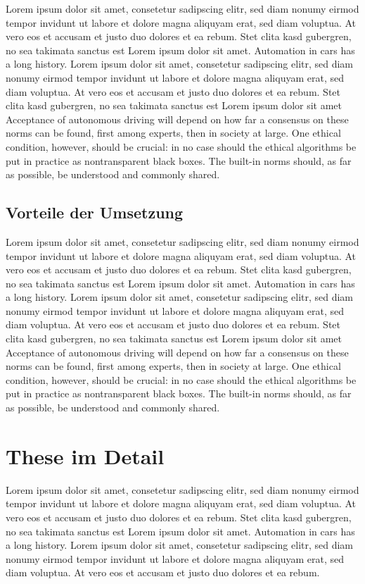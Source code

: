 Lorem ipsum dolor sit amet, consetetur sadipscing elitr, sed diam nonumy eirmod tempor invidunt ut labore et dolore magna aliquyam erat, sed diam voluptua.
At vero eos et accusam et justo duo dolores et ea rebum.
Stet clita kasd gubergren, no sea takimata sanctus est Lorem ipsum dolor sit amet.
Automation in cars has a long history.  Lorem ipsum dolor sit amet, consetetur sadipscing elitr, sed diam nonumy eirmod tempor invidunt ut labore et dolore magna aliquyam erat, sed diam voluptua.
At vero eos et accusam et justo duo dolores et ea rebum.
Stet clita kasd gubergren, no sea takimata sanctus est Lorem ipsum dolor sit amet Acceptance of autonomous driving will depend on how far a consensus on these norms can be found, first among experts, then in society at large.
One ethical condition, however, should be crucial: in no case should the ethical algorithms be put in practice as nontransparent black boxes.
The built-in norms should, as far as possible, be understood and commonly shared.


\subsection{Vorteile der Umsetzung}

Lorem ipsum dolor sit amet, consetetur sadipscing elitr, sed diam nonumy eirmod tempor invidunt ut labore et dolore magna aliquyam erat, sed diam voluptua.
At vero eos et accusam et justo duo dolores et ea rebum.
Stet clita kasd gubergren, no sea takimata sanctus est Lorem ipsum dolor sit amet.
Automation in cars has a long history.  Lorem ipsum dolor sit amet, consetetur sadipscing elitr, sed diam nonumy eirmod tempor invidunt ut labore et dolore magna aliquyam erat, sed diam voluptua.
At vero eos et accusam et justo duo dolores et ea rebum.
Stet clita kasd gubergren, no sea takimata sanctus est Lorem ipsum dolor sit amet Acceptance of autonomous driving will depend on how far a consensus on these norms can be found, first among experts, then in society at large.
One ethical condition, however, should be crucial: in no case should the ethical algorithms be put in practice as nontransparent black boxes.
The built-in norms should, as far as possible, be understood and commonly shared.

\section{These im Detail}

Lorem ipsum dolor sit amet, consetetur sadipscing elitr, sed diam nonumy eirmod tempor invidunt ut labore et dolore magna aliquyam erat, sed diam voluptua.
At vero eos et accusam et justo duo dolores et ea rebum.
Stet clita kasd gubergren, no sea takimata sanctus est Lorem ipsum dolor sit amet.
Automation in cars has a long history.  Lorem ipsum dolor sit amet, consetetur sadipscing elitr, sed diam nonumy eirmod tempor invidunt ut labore et dolore magna aliquyam erat, sed diam voluptua.
At vero eos et accusam et justo duo dolores et ea rebum.
\newline


